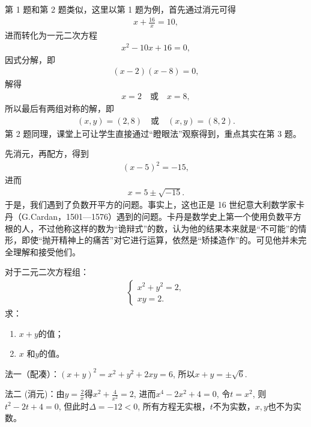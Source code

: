\begin{solution}
    第 1 题和第 2 题类似，这里以第 1 题为例，首先通过消元可得
    \begin{align*}
        x+\frac{16}{x}=10,
    \end{align*}
    进而转化为一元二次方程
    \begin{align*}
        x^2-10x+16=0,
    \end{align*}
    因式分解，即
    \begin{align*}
        (x-2)(x-8)=0,
    \end{align*}
    解得
    \begin{align*}
        x=2 \quad \text{或} \quad x=8,
    \end{align*}
    所以最后有两组对称的解，即
    \begin{align*}
        (x,y)=(2,8) \quad \text{或} \quad (x,y)=(8,2).
    \end{align*}
    第 2 题同理，课堂上可让学生直接通过“瞪眼法”观察得到，重点其实在第 3 题。

    先消元，再配方，得到
    \begin{align*}
        (x-5)^2=-15,
    \end{align*}
    进而
    \begin{align*}
        x = 5\pm\sqrt{-15}.
    \end{align*}
    于是，我们遇到了负数开平方的问题。事实上，这也正是 16 世纪意大利数学家卡丹（G.Cardan，1501—1576）遇到的问题。卡丹是数学史上第一个使用负数平方根的人，不过他称这样的数为“诡辩式”的数，认为他的结果本来就是“不可能”的情形，即使“抛开精神上的痛苦”对它进行运算，依然是“矫揉造作”的。可见他并未完全理解和接受他们。
\end{solution}

\begin{activity}[莱布尼兹的方程]
    对于二元二次方程组：
    \begin{align}
        \begin{cases}
            x^2+y^2=2, \\
            xy=2.
        \end{cases}
        \label{eq:leibniz}
    \end{align}
    求：
    \begin{enumerate}
        \item $x+y$的值；
        \item $x$ 和$y$的值。
    \end{enumerate}
\end{activity}

\begin{solution}
    法一（配凑）：$(x+y)^2= x^2+y^2+2xy=6$, 所以$x+y=\pm \sqrt{6}$.

    法二 (消元)：由$y=\frac{2}{x}$得$x^2+\frac{4}{x^2}=2$, 进而$x^4-2x^2+4=0$, 令$t=x^2$, 则$t^2-2t+4=0$, 但此时$\Delta=-12<0$, 所有方程无实根，$t$不为实数，$x,y$也不为实数。
\end{solution}

